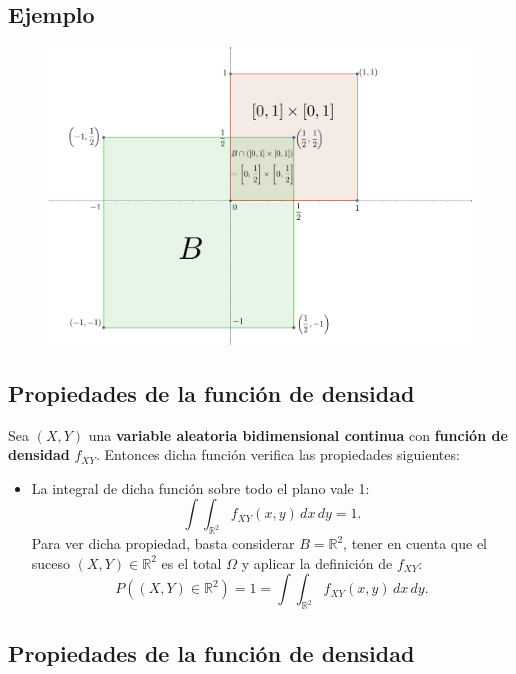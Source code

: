 \documentclass[]{book}
\providecommand{\tightlist}{%
  \setlength{\itemsep}{0pt}\setlength{\parskip}{0pt}}
\begin{document}
\hypertarget{ejemplo-41}{%
\subsection{Ejemplo}\label{ejemplo-41}}

\begin{figure}
\includegraphics[width=700px]{Images/VaUniformeBidi} \end{figure}

\hypertarget{propiedades-de-la-funciuxf3n-de-densidad}{%
\subsection{Propiedades de la función de densidad}\label{propiedades-de-la-funciuxf3n-de-densidad}}

Sea \((X,Y)\) una \textbf{variable aleatoria bidimensional continua} con \textbf{función de densidad} \(f_{XY}\). Entonces dicha función verifica las propiedades siguientes:

\begin{itemize}
\tightlist
\item
  La integral de dicha función sobre todo el plano vale 1:
  \[
  \int\int_{\mathbb{R}^2} f_{XY}(x,y)\,dx\,dy =1.
  \]
  Para ver dicha propiedad, basta considerar \(B=\mathbb{R}^2\), tener en cuenta que el suceso \((X,Y)\in \mathbb{R}^2\) es el total \(\Omega\) y aplicar la definición de \(f_{XY}\):
  \[
  P((X,Y)\in \mathbb{R}^2)=1= \int\int_{\mathbb{R}^2} f_{XY}(x,y)\,dx\,dy.
  \]
\end{itemize}

\hypertarget{propiedades-de-la-funciuxf3n-de-densidad-1}{%
\subsection{Propiedades de la función de densidad}\label{propiedades-de-la-funciuxf3n-de-densidad-1}}
\end{document}
